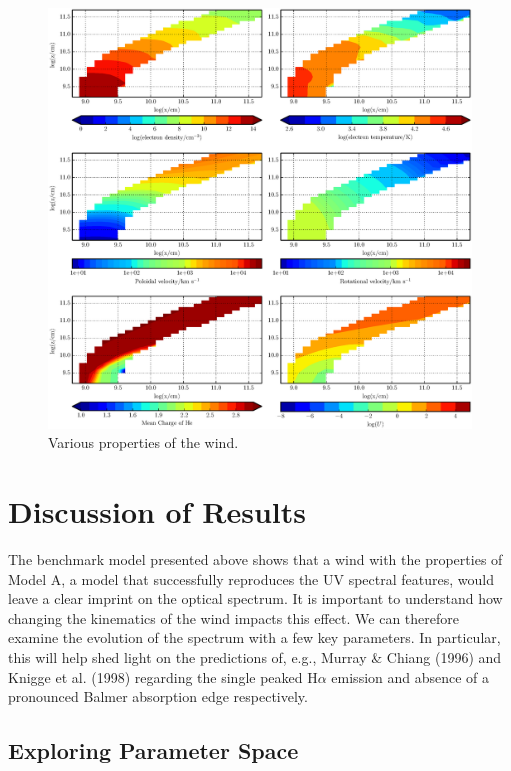 \documentclass[preprint, a4paper, 11pt]{aastex}
\begin{document}
\begin{figure} %
\includegraphics[width=\textwidth]{figures/fig5.eps}
\caption{Various properties of the wind.}
\label{wind}
\end{figure} %



%
%

\section{Discussion of Results}

The benchmark model presented above shows that a wind with the properties
of Model A, a model that successfully reproduces the UV spectral features,
would leave a clear imprint on the optical spectrum. It is important
to understand how changing the kinematics of the wind impacts this
effect. We can therefore examine the evolution
of the spectrum with a few key parameters. In particular, this
will help shed light on the predictions of, e.g., Murray \& Chiang (1996)
and Knigge et al. (1998) regarding the single peaked H$\alpha$ emission
and absence of a pronounced Balmer absorption edge respectively.

\subsection{Exploring Parameter Space}
\end{document}
